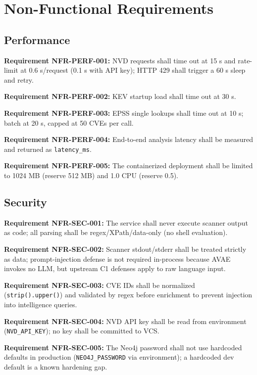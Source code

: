 \documentclass[10pt,journal,onecolumn]{IEEEtran}
\newcommand{\reqid}[1]{\textbf{#1}}
\begin{document}
\section{Non-Functional Requirements}

\subsection{Performance}

\reqid{Requirement NFR-PERF-001:} NVD requests shall time out at 15 s and rate-limit at 0.6 s/request (0.1 s with API key); HTTP 429 shall trigger a 60 s sleep and retry.

\reqid{Requirement NFR-PERF-002:} KEV startup load shall time out at 30 s.

\reqid{Requirement NFR-PERF-003:} EPSS single lookups shall time out at 10 s; batch at 20 s, capped at 50 CVEs per call.

\reqid{Requirement NFR-PERF-004:} End-to-end analysis latency shall be measured and returned as \texttt{latency\_ms}.

\reqid{Requirement NFR-PERF-005:} The containerized deployment shall be limited to 1024 MB (reserve 512 MB) and 1.0 CPU (reserve 0.5).

\subsection{Security}

\reqid{Requirement NFR-SEC-001:} The service shall never execute scanner output as code; all parsing shall be regex/XPath/data-only (no shell evaluation).

\reqid{Requirement NFR-SEC-002:} Scanner stdout/stderr shall be treated strictly as data; prompt-injection defense is not required in-process because AVAE invokes no LLM, but upstream C1 defenses apply to raw language input.

\reqid{Requirement NFR-SEC-003:} CVE IDs shall be normalized (\texttt{strip().upper()}) and validated by regex before enrichment to prevent injection into intelligence queries.

\reqid{Requirement NFR-SEC-004:} NVD API key shall be read from environment (\texttt{NVD\_API\_KEY}); no key shall be committed to VCS.

\reqid{Requirement NFR-SEC-005:} The Neo4j password shall not use hardcoded defaults in production (\texttt{NEO4J\_PASSWORD} via environment); a hardcoded dev default is a known hardening gap.
\end{document}
